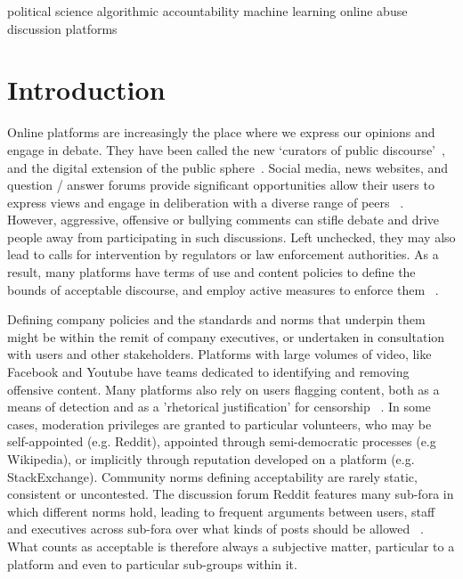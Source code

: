 \documentclass[runningheads,a4paper]{llncs}
\begin{document}
\begin{keywords}
political science
algorithmic accountability
machine learning
online abuse
discussion platforms
\end{keywords}

\section{Introduction}

Online platforms are increasingly the place where we express our opinions and engage in debate. They have been called the new `curators of public discourse'~\cite{gillespie2010politics}, and the digital extension of the public sphere~\cite{dahlberg2001internet}. Social media, news websites, and question / answer forums provide significant opportunities allow their users to express views and engage in deliberation with a diverse range of peers ~\cite{halpern2013social}. However, aggressive, offensive or bullying comments can stifle debate and drive people away from participating in such discussions. Left unchecked, they may also lead to calls for intervention by regulators or law enforcement authorities. As a result, many platforms have terms of use and content policies to define the bounds of acceptable discourse, and employ active measures to enforce them ~\cite{ksiazek2015civil}.
 
Defining company policies and the standards and norms that underpin them might be within the remit of company executives, or undertaken in consultation with users and other stakeholders. Platforms with large volumes of video, like Facebook and Youtube have teams dedicated to identifying and removing offensive content. Many platforms also rely on users flagging content, both as a means of detection and as a 'rhetorical justification' for censorship ~\cite{crawford2016flag}. In some cases, moderation privileges are granted to particular volunteers, who may be self-appointed (e.g. Reddit), appointed through semi-democratic processes (e.g Wikipedia), or implicitly through reputation developed on a platform (e.g. StackExchange). Community norms defining acceptability are rarely static, consistent or uncontested. The discussion forum Reddit features many sub-fora in which different norms hold, leading to frequent arguments between users, staff and executives across sub-fora over what kinds of posts should be allowed ~\cite{centivany2016values}. What counts as acceptable is therefore always a subjective matter, particular to a platform and even to particular sub-groups within it.
\end{document}
